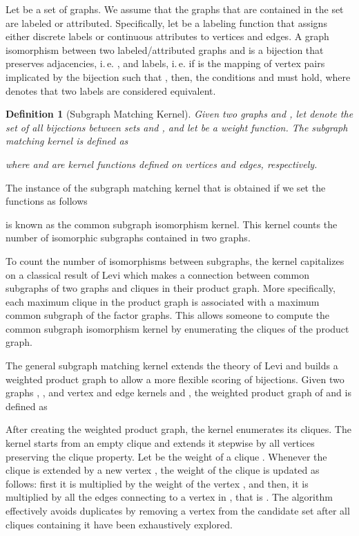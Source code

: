 \documentclass[twoside,11pt]{article}
\newcommand{\ie}{i.\,e. }
\newtheorem{definition}{Definition}
\begin{document}
Let  be a set of graphs.
We assume that the graphs that are contained in the set are labeled or attributed.
Specifically, let  be a labeling function that assigns either discrete labels or continuous attributes to vertices and edges.
A graph isomorphism between two labeled/attributed graphs  and  is a bijection  that preserves adjacencies, \ie , and labels, \ie if  is the mapping of vertex pairs implicated by the bijection  such that , then, the conditions  and  must hold, where  denotes that two labels are considered equivalent.

\begin{definition}[Subgraph Matching Kernel]
  Given two graphs  and , let  denote the set of all bijections between sets  and , and let  be a weight function.
  The subgraph matching kernel is defined as
  
  where  and  are kernel functions defined on vertices and edges, respectively.
\end{definition}

The instance of the subgraph matching kernel that is obtained if we set the  functions as follows

is known as the common subgraph isomorphism kernel.
This kernel counts the number of isomorphic subgraphs contained in two graphs.

To count the number of isomorphisms between subgraphs, the kernel capitalizes on a classical result of Levi \citeyear{levi1973note} which makes a connection between common subgraphs of two graphs and cliques in their product graph.
More specifically, each maximum clique in the product graph is associated with a maximum common subgraph of the factor graphs.
This allows someone to compute the common subgraph isomorphism kernel by enumerating the cliques of the product graph.

The general subgraph matching kernel extends the theory of Levi and builds a weighted product graph to allow a more flexible scoring of bijections.
Given two graphs , , and vertex and edge kernels  and , the weighted product graph  of  and  is defined as

After creating the weighted product graph, the kernel enumerates its cliques.
The kernel starts from an empty clique and extends it stepwise by all vertices preserving the clique property.
Let  be the weight of a clique .
Whenever the clique  is extended by a new vertex , the weight of the clique is updated as follows: first it is multiplied by the weight of the vertex , and then, it is multiplied by all the edges connecting  to a vertex in , that is .
The algorithm effectively avoids duplicates by removing a vertex from the candidate set after all cliques containing it have been exhaustively explored.
\end{document}
